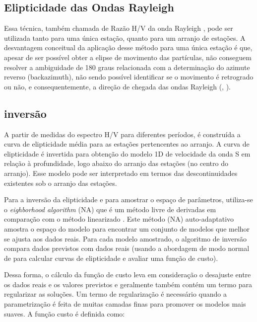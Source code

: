 \documentclass[smallextended]{svjour3}       %
\begin{document}
\subsection{Elipticidade das Ondas Rayleigh}

Essa técnica, também chamada de Razão H/V da onda Rayleigh \citep{workman2017determination}, pode ser utilizada tanto para uma única estação, quanto para um arranjo de estações. A desvantagem conceitual da aplicação desse método para uma única estação é que, apesar de ser possível obter a elipse de movimento das partículas, não conseguem resolver a ambiguidade de 180 graus relacionada com a determinação do azimute reverso (backazimuth), não sendo possível identificar se o movimento é retrogrado ou não, e consequentemente, a direção de chegada das ondas Rayleigh (\citealp{workman2017determination}, \citealp{berbellini2019constraining}).

\subsection{inversão}

A partir de medidas do espectro H/V para diferentes períodos, é construída a curva de elipticidade média para as estações pertencentes ao arranjo. A curva de elipticidade é invertida para obtenção do modelo 1D de velocidade da onda S em relação à profundidade, logo abaixo do arranjo das estações (no centro do arranjo). Esse modelo pode ser interpretado em termos das descontinuidades existentes sob o arranjo das estações.

Para a inversão da elipticidade e para amostrar o espaço de parâmetros, utiliza-se o \textit{eighborhood algorithm} (NA) \citep{wathelet2008array} que é um método livre de derivadas em comparação com o método linearizado \citep{menke1989geophysical}. Este método (NA) auto-adaptativo amostra o espaço do modelo para encontrar um conjunto de modelos que melhor se ajusta aos dados reais. Para cada modelo amostrado, o algoritmo de inversão compara dados previstos com dados reais (usando a abordagem de modo normal de \cite{herrmann2013computer} para calcular curvas de elipticidade e avaliar uma função de custo). 

Dessa forma, o cálculo da função de custo leva em consideração o desajuste entre os dados reais e os valores previstos e geralmente também contém um termo para regularizar as soluções. Um termo de regularização é necessário quando a parametrização é feita de muitas camadas finas para promover os modelos mais suaves. A função custo é definida como:
\end{document}
